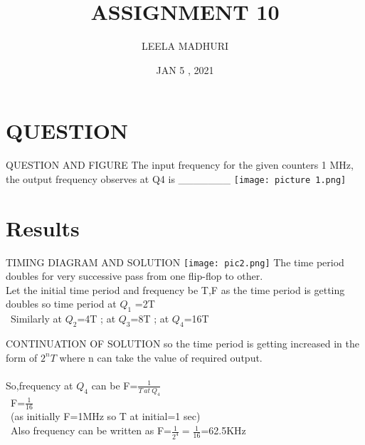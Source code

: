 \documentclass[9pt]{beamer}
\title{ASSIGNMENT 10}
\author{LEELA MADHURI}
\date{JAN 5 , 2021}
\begin{document}
\maketitle

\section{QUESTION}

\begin{frame}{QUESTION AND FIGURE}
The input frequency for the given counters 1 MHz,\\ the output frequency observes at Q4 is _______
\texttt{[image: picture 1.png]}


\end{frame}

\section{Results}

\begin{frame}{TIMING DIAGRAM AND SOLUTION}
\texttt{[image: pic2.png]}
The time period doubles for very successive pass from one flip-flop to other.\\
  Let the initial time period and frequency be T,F as the time period is getting doubles so
  time period at $Q_1$ =2T\\\
  Similarly at $Q_2$=4T ; at $Q_3$=8T ; at $Q_4$=16T 
\end{frame}
\begin{frame}{CONTINUATION OF SOLUTION}
so the time period is getting increased in the form of $2^{n}T$ where n can take the value of required output.\\\\
So,frequency at $Q_4$ can be F=$\frac{1}{T \  at \  Q_4 }$\\\
F=$\frac{1}{16}$\\\ {(as initially F=1MHz so T at initial=1 sec)}\\\
Also frequency can be written as F=$\frac{1}{2^4}=\frac{1}{16}$=62.5KHz


  
    
\end{frame}
\end{document}
